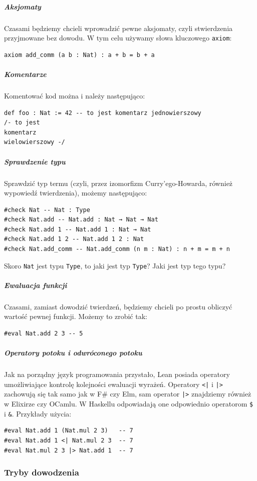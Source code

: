 \documentclass[polish,pretty,bibliography=totocnumbered]{angav}
\newcommand{\Lean}[1]{\texttt{#1}}
\begin{document}
\subparagraph{Aksjomaty}
Czasami będziemy chcieli wprowadzić pewne aksjomaty, czyli stwierdzenia przyjmowane bez dowodu. W tym celu używamy słowa kluczowego \Lean{axiom}:
\begin{verbatim}
axiom add_comm (a b : Nat) : a + b = b + a
\end{verbatim}

\subparagraph{Komentarze}
Komentować kod można i należy następująco:
\begin{verbatim}
def foo : Nat := 42 -- to jest komentarz jednowierszowy
/- to jest
komentarz
wielowierszowy -/
\end{verbatim}

\subparagraph{Sprawdzenie typu}
Sprawdzić typ termu (czyli, przez izomorfizm Curry'ego-Howarda, również wypowiedź twierdzenia), możemy następująco:
\begin{verbatim}
#check Nat -- Nat : Type
#check Nat.add -- Nat.add : Nat → Nat → Nat
#check Nat.add 1 -- Nat.add 1 : Nat → Nat
#check Nat.add 1 2 -- Nat.add 1 2 : Nat
#check Nat.add_comm -- Nat.add_comm (n m : Nat) : n + m = m + n
\end{verbatim}

\begin{problem}
    \label{prob:type-of-type}
    Skoro \Lean{Nat} jest typu \Lean{Type}, to jaki jest typ \Lean{Type}? Jaki jest typ tego typu?
\end{problem}

\subparagraph{Ewaluacja funkcji}
Czasami, zamiast dowodzić twierdzeń, będziemy chcieli po prostu obliczyć wartość pewnej funkcji. Możemy to zrobić tak:
\begin{verbatim}
#eval Nat.add 2 3 -- 5
\end{verbatim}

\subparagraph{Operatory potoku i odwróconego potoku}
Jak na porządny język programowania przystało, Lean posiada operatory umożliwiające kontrolę kolejności ewaluacji wyrażeń. Operatory \texttt{<|} i \texttt{|>} zachowują się tak samo jak w F\# czy Elm, sam operator \texttt{|>} znajdziemy również w Elixirze czy OCamlu.
W Haskellu odpowiadają one odpowiednio operatorom \texttt{\$} i \texttt{\&}. Przykłady użycia:
\begin{verbatim}
#eval Nat.add 1 (Nat.mul 2 3)   -- 7
#eval Nat.add 1 <| Nat.mul 2 3  -- 7
#eval Nat.mul 2 3 |> Nat.add 1  -- 7
\end{verbatim}

\subsubsection{Tryby dowodzenia}
\end{document}
